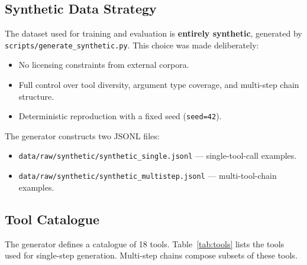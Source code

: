 \documentclass[12pt, a4paper]{article}
\begin{document}
\subsection{Synthetic Data Strategy}

The dataset used for training and evaluation is \textbf{entirely synthetic},
generated by \texttt{scripts/generate\_synthetic.py}. This choice was made
deliberately:

\begin{itemize}[leftmargin=1.5em, itemsep=4pt]
  \item No licensing constraints from external corpora.
  \item Full control over tool diversity, argument type coverage, and
    multi-step chain structure.
  \item Deterministic reproduction with a fixed seed (\texttt{seed=42}).
\end{itemize}

The generator constructs two JSONL files:

\begin{itemize}[leftmargin=1.5em, itemsep=3pt]
  \item \texttt{data/raw/synthetic/synthetic\_single.jsonl} --- single-tool-call examples.
  \item \texttt{data/raw/synthetic/synthetic\_multistep.jsonl} --- multi-tool-chain examples.
\end{itemize}

\subsection{Tool Catalogue}

The generator defines a catalogue of 18 tools. Table~\ref{tab:tools} lists
the tools used for single-step generation. Multi-step chains compose subsets
of these tools.
\end{document}
